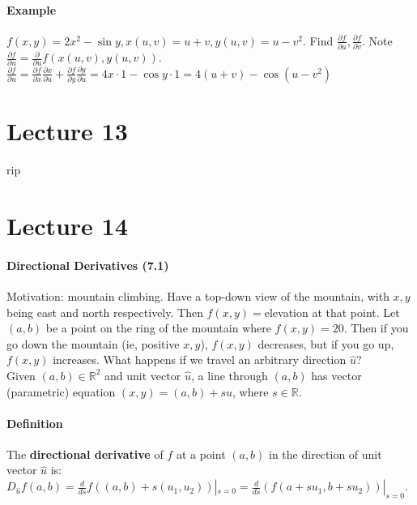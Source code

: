 \documentclass[tikz,10pt,letter]{article}
\theoremstyle{plain}
\theoremstyle{definition}
\begin{document}
\paragraph{Example}
$f(x,y)=2x^2-\sin y, x(u,v)=u+v,y(u,v)=u-v^2$. Find $\frac{\partial f}{\partial u},\frac{\partial f}{\partial v}$. Note $\frac{\partial f}{\partial u}=\frac{\partial}{\partial u}f(x(u,v),y(u,v))$. $\frac{\partial f}{\partial u}=\frac{\partial f}{\partial x}\frac{\partial x}{\partial u}+\frac{\partial f}{\partial y}\frac{\partial y}{\partial u}=4x\cdot1-\cos y\cdot1=4(u+v)-\cos(u-v^2)$

\section*{Lecture 13}
rip 

\section*{Lecture 14}
\paragraph{Directional Derivatives (7.1)}
Motivation: mountain climbing. Have a top-down view of the mountain, with $x,y$ being east and north respectively. Then $f(x,y)=$elevation at that point. Let $(a,b)$ be a point on the ring of the mountain where $f(x,y)=20$. Then if you go down the mountain (ie, positive $x,y$), $f(x,y)$ decreases, but if you go up, $f(x,y)$ increases. What happens if we travel an arbitrary direction $\hat{u}$? \\ 
Given $(a,b)\in\mathbb{R}^2$ and unit vector $\hat{u}$, a line through $(a,b)$ has vector (parametric) equation $(x,y)=(a,b)+s\hat{u}$, where $s\in\mathbb{R}$.  
\paragraph{Definition} The \textbf{directional derivative} of $f$ at a point $(a,b)$ in the direction of unit vector $\hat{u}$ is: $D_{\hat{u}}f(a,b)=\frac{d}{ds}f((a,b)+s(u_1,u_2))|_{s=0}=\frac{d}{ds}(f(a+su_1,b+su_2))|_{s=0}$. 
\end{document}
